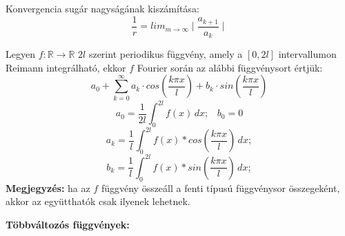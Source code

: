 \documentclass[11pt,a4paper]{article}
\begin{document}
\begin{tcolorbox}[colback=blue!5!white,colframe=blue!70!black,title= 8. Konvergencia sugár{,} konvergencia tartomány]
Konvergencia sugár nagyságának kiszámítása:
$$\frac{1}{r} = lim_{m \to \infty} \mid \frac{a_{k +1}}{a_k} \mid$$
\end{tcolorbox}
\begin{tcolorbox}[colback=blue!5!white,colframe=blue!70!black,title= 9. Fourier-sor]
Legyen \( f : \mathbb{R} \to \mathbb{R}\) \(2l\) szerint periodikus függvény, amely a \([0, 2l]\) intervallumon Reimann integrálható, ekkor \(f\) Fourier során az alábbi függvénysort értjük:
$$ a_0 + \sum_{k=0}^{\infty} a_k\cdot cos(\frac{k\pi x}{l}) + b_k\cdot sin(\frac{k \pi x}{l})$$
$$a_0 = \frac{1}{2l} \int_{0}^{2l} f(x)\,dx; \hspace{10pt}b_0 = 0 $$
$$a_k = \frac{1}{l} \int_{0}^{2l} f(x)* cos(\frac{k \pi x}{l})\,dx;$$
$$b_k = \frac{1}{l} \int_{0}^{2l} f(x)* sin(\frac{k \pi x}{l})\,dx;$$
\textbf{Megjegyzés:} ha az \(f\) függvény összeáll a fenti típusú függvénysor összegeként, akkor az együtthatók csak ilyenek lehetnek.
\end{tcolorbox}

\newpage
\textbf{Többváltozós függvények:}
\end{document}
